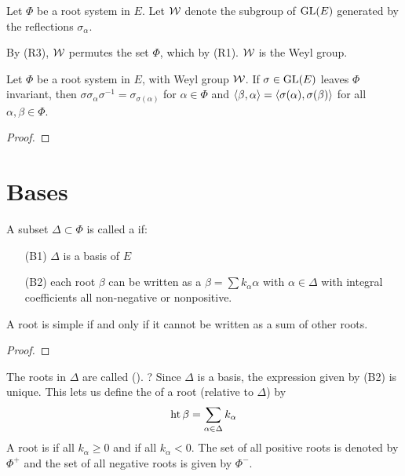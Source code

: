 Let $\Phi$ be a root system in $E$. Let $\mathcal{W}$ denote the subgroup of $\operatorname{GL}(E)$ generated by the reflections $\sigma_\alpha$. 

By (R3), $\mathcal{W}$ permutes the set $\Phi$, which by (R1).
$\mathcal{W}$ is the Weyl group.

\begin{lemma}
    Let $\Phi$  be a root system in $E$, with Weyl group $\mathcal{W}$. If $\sigma\in \operatorname{GL}(E)$ leaves $\Phi$ invariant, then $\sigma \sigma_\alpha \sigma^{-1} = \sigma_{\sigma(\alpha)}$ for $\alpha\in \Phi$ and $\langle\beta,\alpha\rangle=\langle\sigma(\alpha),\sigma(\beta)\rangle$  for all $\alpha,\beta \in \Phi$.
\end{lemma}
\begin{proof}
    
\end{proof}

\section{Bases}
\label{sec:bases}

A subset $\Delta \subset \Phi$ is called a  if:
\begin{itemize}
    \makethislistcompact
    \item [(B1)] $\Delta$ is a basis of $E$
    \item [(B2)] each root $\beta$ can be written as a $\beta = \sum k_\alpha \alpha$ with $\alpha\in \Delta$ with integral coefficients all non-negative or nonpositive.
\end{itemize}

\begin{insight}
   \begin{lemma}
       A root is simple if and only if it cannot be written as a sum of other roots.
   \end{lemma} 
   \begin{proof}
   \end{proof}
\end{insight}

The roots in $\Delta$ are called  ().
? 
Since $\Delta$ is a basis, the expression given by (B2) is unique. This lets us define the  of a root (relative to $\Delta$) by 
\begin{align}
    \operatorname{ht} \beta = \sum_{\alpha\in \Delta} k_\alpha
\end{align}
A root is  if all $k_\alpha\geq0$ and  if all $k_\alpha<0$. The set of all positive roots is denoted by $\Phi^+$ and the set of all negative roots is given by $\Phi^-$.

